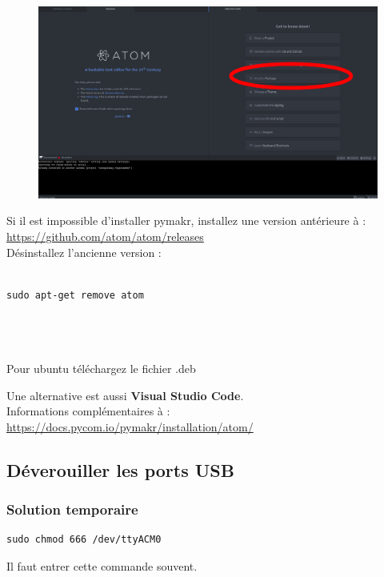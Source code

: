 \documentclass{article}
\begin{document}
    \begin{figure}[H]
\begin{center}
\advance\leftskip-3cm
\advance\rightskip-3cm
\includegraphics[keepaspectratio=true,scale=0.2]{atom_installpymakr.png}
\label{visina8}
\end{center}\end{figure}

Si il est impossible d'installer pymakr, installez une version antérieure à : \url{https://github.com/atom/atom/releases}\\
Désinstallez l'ancienne version :
\begin{verbatim}

sudo apt-get remove atom




\end{verbatim}

Pour ubuntu téléchargez le fichier .deb

Une alternative est aussi \textbf{Visual Studio Code}. \\

Informations complémentaires à  : \url{https://docs.pycom.io/pymakr/installation/atom/}

\subsection{Déverouiller les ports USB}
\subsubsection{Solution temporaire} 


\begin{verbatim}
sudo chmod 666 /dev/ttyACM0
\end{verbatim}
Il faut entrer cette commande souvent. \\
\end{document}
